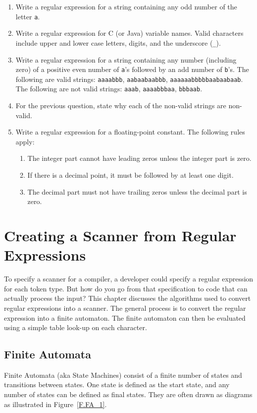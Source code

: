 \documentclass[letterpaper,12pt,openany,reqno]{book}%
\begin{document}
\begin{enumerate}
\item Write a regular expression for a string containing any odd number of the letter \texttt{a}.
\item Write a regular expression for C (or Java) variable names. Valid characters include upper and lower case letters, digits, and the underscore (\texttt{\_}).
\item Write a regular expression for a string containing any number (including zero) of a positive even number of \texttt{a}'s followed by an add number of \texttt{b}'s. The following are valid strings: \texttt{aaaabbb}, \texttt{aabaabaabbb}, \texttt{aaaaaabbbbbaabaabaab}. The following are not valid strings: \texttt{aaab}, \texttt{aaaabbbaa}, \texttt{bbbaab}.
\item For the previous question, state why each of the non-valid strings are non-valid.
\item Write a regular expression for a floating-point constant. The following rules apply: 
\begin{enumerate}
\item The integer part cannot have leading zeros unless the integer part is zero. 
\item If there is a decimal point, it must be followed by at least one digit.
\item The decimal part must not have trailing zeros unless the decimal part is zero.
\end{enumerate}
\end{enumerate}

\chapter[Creating a Scanner]{Creating a Scanner from Regular Expressions}

To specify a scanner for a compiler, a developer could specify a regular expression for each token type. But how do you go from that specification to code that can actually process the input? This chapter discusses the algorithms used to convert regular expressions into a scanner. The general process is to convert the regular expression into a finite automaton. The finite automaton can then be evaluated using a simple table look-up on each character.

\section{Finite Automata}
Finite Automata (aka State Machines) consist of a finite number of states and transitions between states. One state is defined as the start state, and any number of states can be defined as final states. They are often drawn as diagrams as illustrated in Figure~\ref{F.FA_1}.
\end{document}

